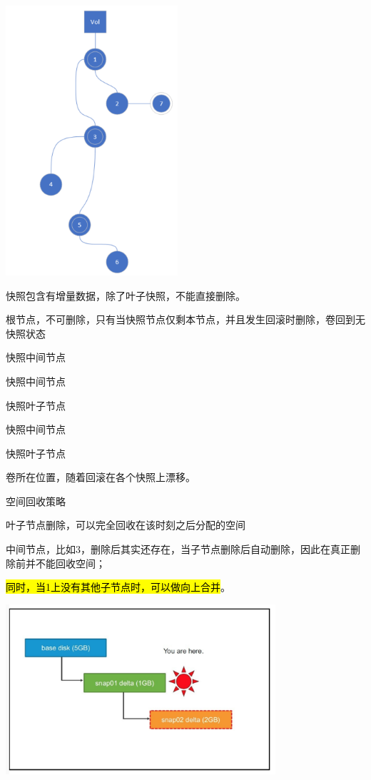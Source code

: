 \begin{center}
\includegraphics[height=10cm]{../imgs/snaptree.png}
\end{center}

快照包含有增量数据，除了叶子快照，不能直接删除。
\begin{enumbox}
\item 根节点，不可删除，只有当快照节点仅剩本节点，并且发生回滚时删除，卷回到无快照状态
\item 快照中间节点
\item 快照中间节点
\item 快照叶子节点
\item 快照中间节点
\item 快照叶子节点
\item 卷所在位置，随着回滚在各个快照上漂移。
\end{enumbox}

空间回收策略
\begin{enumbox}
\item 叶子节点删除，可以完全回收在该时刻之后分配的空间
\item 中间节点，比如3，删除后其实还存在，当子节点删除后自动删除，因此在真正删除前并不能回收空间；
\item \hl{同时，当1上没有其他子节点时，可以做向上合并}。
\end{enumbox}

\begin{center}
\includegraphics[width=10cm]{../imgs/snap-delete-leaf.png}
\end{center}

